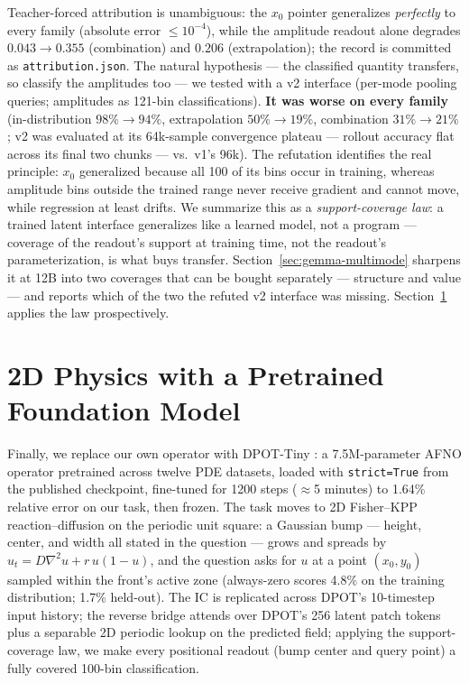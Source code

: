 \documentclass[11pt]{article}
\newcommand{\code}[1]{\texttt{#1}}
\begin{document}
Teacher-forced attribution is unambiguous: the $x_0$ pointer generalizes \emph{perfectly} to every family (absolute error $\le 10^{-4}$), while the amplitude readout alone degrades $0.043 \to 0.355$ (combination) and $0.206$ (extrapolation); the record is committed as \code{attribution.json}. The natural hypothesis --- the classified quantity transfers, so classify the amplitudes too --- we tested with a v2 interface (per-mode pooling queries; amplitudes as 121-bin classifications). \textbf{It was worse on every family} (in-distribution $98\%\!\to\!94\%$, extrapolation $50\%\!\to\!19\%$, combination $31\%\!\to\!21\%$; v2 was evaluated at its 64k-sample convergence plateau --- rollout accuracy flat across its final two chunks --- vs.\ v1's 96k). The refutation identifies the real principle: $x_0$ generalized because all 100 of its bins occur in training, whereas amplitude bins outside the trained range never receive gradient and cannot move, while regression at least drifts. We summarize this as a \emph{support-coverage law}: a trained latent interface generalizes like a learned model, not a program --- coverage of the readout's support at training time, not the readout's parameterization, is what buys transfer. Section~\ref{sec:gemma-multimode} sharpens it at 12B into two coverages that can be bought separately --- structure and value --- and reports which of the two the refuted v2 interface was missing. Section~\ref{sec:2d} applies the law prospectively.

\section{2D Physics with a Pretrained Foundation Model}
\label{sec:2d}

Finally, we replace our own operator with DPOT-Tiny \citep{hao2024dpot}: a 7.5M-parameter AFNO operator pretrained across twelve PDE datasets, loaded with \code{strict=True} from the published checkpoint, fine-tuned for 1200 steps ($\approx$5 minutes) to 1.64\% relative error on our task, then frozen. The task moves to 2D Fisher--KPP reaction--diffusion on the periodic unit square: a Gaussian bump --- height, center, and width all stated in the question --- grows and spreads by $u_t = D\nabla^2 u + r\,u(1-u)$, and the question asks for $u$ at a point $(x_0,y_0)$ sampled within the front's active zone (always-zero scores 4.8\% on the training distribution; 1.7\% held-out). The IC is replicated across DPOT's 10-timestep input history; the reverse bridge attends over DPOT's 256 latent patch tokens plus a separable 2D periodic lookup on the predicted field; applying the support-coverage law, we make every positional readout (bump center and query point) a fully covered 100-bin classification.
\end{document}
